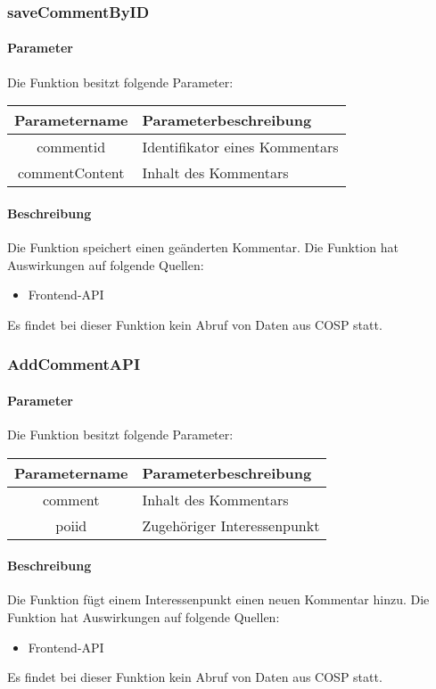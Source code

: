 \subsubsection{saveCommentByID}
\paragraph{Parameter} Die Funktion besitzt folgende Parameter:
\begin{table}[H]
	\begin{tabular}{|c|p{11cm}|}
		\hline
		\textbf{Parametername} & \textbf{Parameterbeschreibung} \\ \hline
		commentid      & Identifikator eines Kommentars \\ \hline
		commentContent & Inhalt des Kommentars \\ \hline
	\end{tabular}
\end{table}
\paragraph{Beschreibung} Die Funktion speichert einen geänderten Kommentar. Die Funktion hat Auswirkungen auf folgende Quellen:
\begin{itemize}
	\item Frontend-API
\end{itemize}
Es findet bei dieser Funktion kein Abruf von Daten aus {\glqq COSP\grqq} statt.
\subsubsection{AddCommentAPI}
\paragraph{Parameter} Die Funktion besitzt folgende Parameter:
\begin{table}[H]
	\begin{tabular}{|c|p{11cm}|}
		\hline
		\textbf{Parametername} & \textbf{Parameterbeschreibung} \\ \hline
		comment & Inhalt des Kommentars \\ \hline
		poiid   & Zugehöriger Interessenpunkt \\ \hline
	\end{tabular}
\end{table}
\paragraph{Beschreibung} Die Funktion fügt einem Interessenpunkt einen neuen Kommentar hinzu. Die Funktion hat Auswirkungen auf folgende Quellen:
\begin{itemize}
	\item Frontend-API
\end{itemize}
Es findet bei dieser Funktion kein Abruf von Daten aus {\glqq COSP\grqq} statt.
